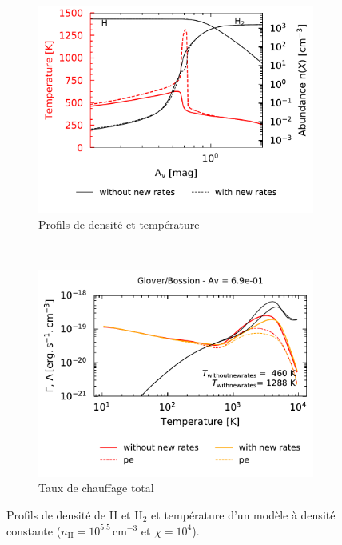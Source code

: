 \begin{figure}[!h]
    \centering
    \begin{subfigure}[t]{0.49\textwidth} %
        \centering \includegraphics[trim = {0 0 0 0 },clip,width=1\textwidth]{figure/H2/pic/profilT.pdf}
        \caption{Profils de densité et température}
        \label{fig:H2:Bossion:profilT}
    \end{subfigure}
    ~ 
    \begin{subfigure}[t]{0.49\textwidth}
        \centering \includegraphics[trim = {0 0 0 1cm },clip,width=1\textwidth]{figure/H2/pic/GCcomp_h_6p9em01.pdf}
        \caption{Taux de chauffage total}
         \label{fig:H2:Bossion:zer}
    \end{subfigure}
    \caption{Profils de densité de $\mathrm{H}$ et $\mathrm{H}_2$ et température d'un modèle à densité constante ($n_\mathrm{H} = 10^{5.5}\,\mathrm{cm}^{-3}$ et $\chi = 10^4$).}
\end{figure}





